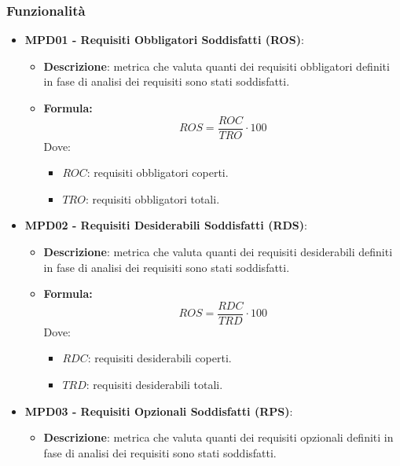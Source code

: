 \documentclass[10pt]{article}
\begin{document}
\begin{justify}
\subsubsection{Funzionalità}
\begin{itemize}
    \item   \textbf{MPD01 - Requisiti Obbligatori Soddisfatti (ROS)}:
            \begin{itemize}
                \item   \textbf{Descrizione}: metrica che valuta quanti dei requisiti obbligatori definiti in fase di analisi dei requisiti sono stati soddisfatti.
                \item   \textbf{Formula:}
                        \[
                        ROS = \frac{ROC}{TRO} \cdot 100
                        \]
                        Dove:
                        \begin{itemize}
                            \item $ROC$: requisiti obbligatori coperti.
                            \item $TRO$: requisiti obbligatori totali.
                        \end{itemize}
            \end{itemize}
    \item   \textbf{MPD02 - Requisiti Desiderabili Soddisfatti (RDS)}:
            \begin{itemize}
                \item   \textbf{Descrizione}: metrica che valuta quanti dei requisiti desiderabili definiti in fase di analisi dei requisiti sono stati soddisfatti.
                \item   \textbf{Formula:}
                        \[
                        ROS = \frac{RDC}{TRD} \cdot 100
                        \]
                        Dove:
                        \begin{itemize}
                            \item $RDC$: requisiti desiderabili coperti.
                            \item $TRD$: requisiti desiderabili totali.
                        \end{itemize}
            \end{itemize}
    \item   \textbf{MPD03 - Requisiti Opzionali Soddisfatti (RPS)}:
            \begin{itemize}
                \item   \textbf{Descrizione}: metrica che valuta quanti dei requisiti opzionali definiti in fase di analisi dei requisiti sono stati soddisfatti.

\end{itemize}
\end{itemize}
\end{justify}
\end{document}
